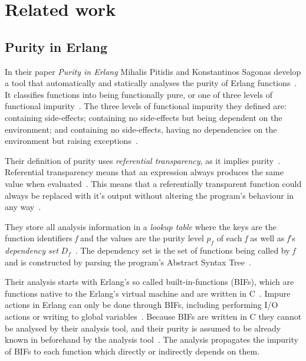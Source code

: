 \documentclass[a4paper,12pt]{article}
\begin{document}
\section{Related work} \label{sec:Related work} %


\subsection{Purity in Erlang} \label{sub:Purity-in-Erlang}

In their paper \textit{Purity in Erlang} Mihalis Pitidis and Konstantinos Sagonas develop a tool that automatically and statically analyses the purity of Erlang functions~\cite{pitidis2010purity}. It classifies functions into being functionally pure, or one of three levels of functional impurity~\cite{pitidis2010purity}.
The three levels of functional impurity they defined are: containing side-effects; containing no side-effects but being dependent on the environment; and containing no side-effects, having no dependencies on the environment but raising exceptions~\cite{pitidis2010purity}.

Their definition of purity uses \textit{referential transparency}, as it implies purity~\cite{pitidis2010purity}. Referential transparency means that an expression always produces the same value when evaluated~\cite{pitidis2010purity}. This means that a referentially transparent function could always be replaced with it's output without altering the program's behaviour in any way~\cite{pitidis2010purity}.

They store all analysis information in a \textit{lookup table} where the keys are the function identifiers \textit{f} and the values are the purity level \textit{$p_f$} of each \textit{f} as well as \textit{f}'s \textit{dependency set} $D_f$~\cite{pitidis2010purity}. The dependency set is the set of functions being called by \textit{f} and is constructed by parsing the program's Abstract Syntax Tree~\cite{pitidis2010purity}.

Their analysis starts with Erlang's so called built-in-functions (BIFs), which are functions native to the Erlang's virtual machine and are written in C~\cite{pitidis2010purity}. Impure actions in Erlang can only be done through BIFs, including performing I/O actions or writing to global variables~\cite{kostis-email}. Because BIFs are written in C they cannot be analysed by their analysis tool, and their purity is assumed to be already known in beforehand by the analysis tool~\cite{pitidis2010purity}. The analysis propagates the impurity of BIFs to each function which directly or indirectly depends on them.
\end{document}
